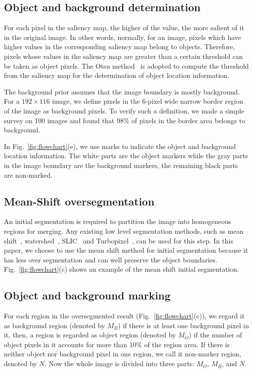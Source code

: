 \documentclass[conference]{IEEEtran}
\begin{document}
\subsection{Object and background determination}

For each pixel in the saliency map, the higher of the value, the more salient of it in the original image. In other words, normally, for an image, pixels which have higher values in the corresponding saliency map belong to objects. Therefore, pixels whose values in the saliency map are greater than a certain threshold can be taken as object pixels. The Otsu method~\cite{otsu1975threshold} is adopted to compute the threshold from the saliency map for the determination of object location information. 

The background prior assumes that the image boundary is mostly background. For a $192 \times 116$ image, we define pixels in the $6$-pixel wide narrow border region of the image as background pixels. To verify such a definition, we made a simple survey on 100 images and found that 98\% of pixels in the border area belongs to background.

In Fig.~\ref{fig:flowchart}(e), we use marks to indicate the object and background location information. The white parts are the object markers while the gray parts in the image boundary are the background markers, the remaining black parts are non-marked. 

\subsection{Mean-Shift oversegmentation}

An initial segmentation is required to partition the image into homogeneous regions for merging. Any existing low level segmentation methods, such as mean shift~\cite{cheng1995mean,comaniciu2002mean}, watershed~\cite{vincent1991watersheds}, SLIC~\cite{achanta2012slic} and Turbopixel~\cite{levinshtein2009turbopixels}, can be used for this step. In this paper, we choose to use the mean shift method for initial segmentation because it has less over segmentation and can well preserve the object boundaries. Fig.~\ref{fig:flowchart}(c) shows an example of the mean shift initial segmentation.

\subsection{Object and background marking}

For each region in the oversegmented result (Fig.~\ref{fig:flowchart}(c)),  we regard it as background region (denoted by $M_B$) if there is at least one background pixel in it, then, a region is regarded as object region (denoted by $M_O$) if the number of object pixels in it accounts for more than 10\% of the region area. If there is neither object nor background pixel in one region, we call it non-marker region, denoted by $N$. Now the whole image is divided into three parts: $M_O$, $M_B$, and $N$.
\end{document}
